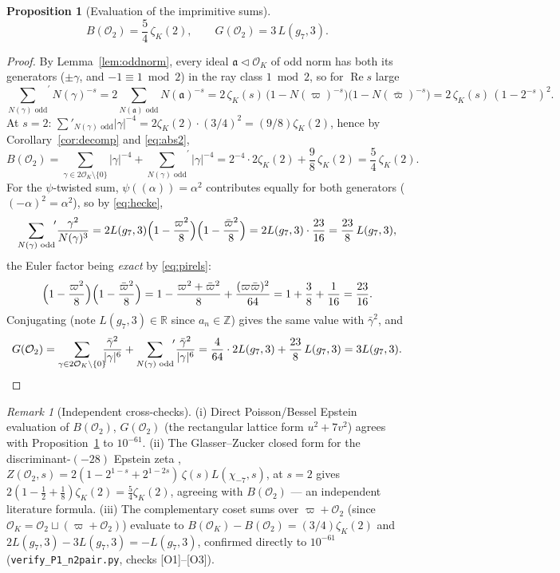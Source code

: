 \documentclass[11pt]{article}
\newtheorem{proposition}[theorem]{Proposition}
\theoremstyle{definition}
\theoremstyle{remark}
\newtheorem{remark}[theorem]{Remark}
\newcommand{\Zz}{\mathbb{Z}}
\newcommand{\Rr}{\mathbb{R}}
\newcommand{\ReT}{\operatorname{Re}}
\newcommand{\OO}{\mathcal{O}}
\begin{document}
\begin{proposition}[Evaluation of the imprimitive sums]\label{prop:BG}
\[
  B(\OO_2)=\frac54\,\zeta_K(2),\qquad
  G(\OO_2)=3\,L(g_7,3).
\]
\end{proposition}
\begin{proof}
By Lemma~\ref{lem:oddnorm}, every ideal $\mathfrak{a}\triangleleft\OO_K$
of odd norm has both its generators ($\pm\gamma$, and $-1\equiv1\bmod2$)
in the ray class $1\bmod2$, so for $\ReT s$ large
\begin{equation}\label{eq:oddzeta}
  {\sum_{N(\gamma)\text{ odd}}}^{\!\prime}N(\gamma)^{-s}
  =2\sum_{N(\mathfrak a)\text{ odd}}N(\mathfrak a)^{-s}
  =2\,\zeta_K(s)\,\bigl(1-N(\varpi)^{-s}\bigr)\bigl(1-N(\bar\varpi)^{-s}\bigr)
  =2\,\zeta_K(s)\,(1-2^{-s})^2 .
\end{equation}
At $s=2$: $\sum'_{N(\gamma)\text{ odd}}|\gamma|^{-4}
=2\zeta_K(2)\cdot(3/4)^2=(9/8)\zeta_K(2)$, hence by
Corollary~\ref{cor:decomp} and \eqref{eq:abs2},
\[
  B(\OO_2)
  ={\sum_{\gamma\in2\OO_K\setminus\{0\}}}\!\!|\gamma|^{-4}
   +{\sum_{N(\gamma)\text{ odd}}}^{\!\prime}|\gamma|^{-4}
  =2^{-4}\cdot2\zeta_K(2)+\frac98\,\zeta_K(2)
  =\frac54\,\zeta_K(2).
\]
For the $\psi$-twisted sum, $\psi((\alpha))=\alpha^2$ contributes equally
for both generators ($(-\alpha)^2=\alpha^2$), so by \eqref{eq:hecke},
\begin{equation}\label{eq:oddhecke}
  {\sum_{N(\gamma)\text{ odd}}}^{\!\prime}\frac{\gamma^2}{N(\gamma)^{3}}
  =2L(g_7,3)\Bigl(1-\frac{\varpi^2}{8}\Bigr)\Bigl(1-\frac{\bar\varpi^2}{8}\Bigr)
  =2L(g_7,3)\cdot\frac{23}{16}=\frac{23}{8}\,L(g_7,3),
\end{equation}
the Euler factor being \emph{exact} by \eqref{eq:pirels}:
\[
  \Bigl(1-\frac{\varpi^2}{8}\Bigr)\Bigl(1-\frac{\bar\varpi^2}{8}\Bigr)
  =1-\frac{\varpi^2+\bar\varpi^2}{8}+\frac{(\varpi\bar\varpi)^2}{64}
  =1+\frac38+\frac1{16}=\frac{23}{16}.
\]
Conjugating (note $L(g_7,3)\in\Rr$ since $a_n\in\Zz$) gives the same value
with $\bar\gamma^2$, and
\[
  G(\OO_2)
  ={\sum_{\gamma\in2\OO_K\setminus\{0\}}}\!\!\frac{\bar\gamma^2}{|\gamma|^6}
   +{\sum_{N(\gamma)\text{ odd}}}^{\!\prime}\frac{\bar\gamma^2}{|\gamma|^6}
  =\frac{4}{64}\cdot2L(g_7,3)+\frac{23}{8}\,L(g_7,3)
  =3L(g_7,3). \qedhere
\]
\end{proof}

\begin{remark}[Independent cross-checks]\label{rem:crosscheck}
(i) Direct Poisson/Bessel Epstein evaluation of $B(\OO_2)$, $G(\OO_2)$
(the rectangular lattice form $u^2+7v^2$) agrees with
Proposition~\ref{prop:BG} to $10^{-61}$. (ii) The Glasser--Zucker closed
form for the discriminant-$(-28)$ Epstein zeta \cite{GZ},
$Z(\OO_2,s)=2(1-2^{1-s}+2^{1-2s})\,\zeta(s)L(\chi_{-7},s)$, at $s=2$ gives
$2(1-\tfrac12+\tfrac18)\zeta_K(2)=\tfrac54\zeta_K(2)$, agreeing with
$B(\OO_2)$ --- an independent literature formula. (iii) The complementary
coset sums over $\varpi+\OO_2$ (since $\OO_K=\OO_2\sqcup(\varpi+\OO_2)$)
evaluate to $B(\OO_K)-B(\OO_2)=(3/4)\zeta_K(2)$ and
$2L(g_7,3)-3L(g_7,3)=-L(g_7,3)$, confirmed directly to $10^{-61}$
(\texttt{verify\_P1\_n2pair.py}, checks [O1]--[O3]).
\end{remark}
\end{document}
